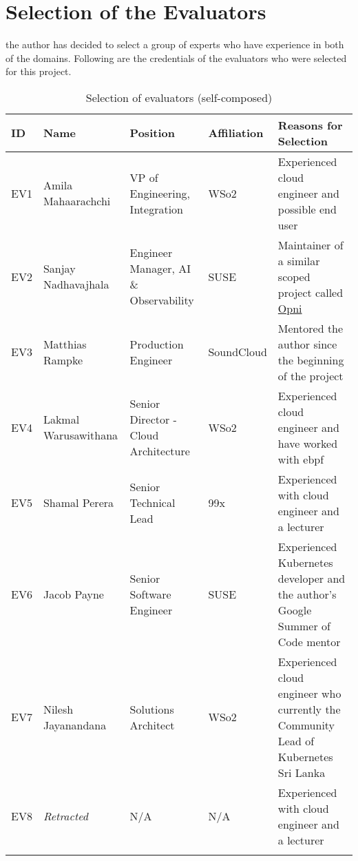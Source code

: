 \section{Selection of the Evaluators}

the author has decided to select a group of experts who have experience in both of the domains. Following are the credentials of the evaluators who were selected for this project. 



\begin{longtable}{|p{8mm}|p{28mm}|p{35mm}|p{21mm}|p{50mm}|}
  \hline
  \textbf{ID} & \textbf{Name} & \textbf{Position} & \textbf{Affiliation} & \textbf{Reasons for Selection} \\ \hline
  EV1 & Amila Mahaarachchi & VP of Engineering, Integration & WSo2 & Experienced cloud engineer  and possible end user \\ \hline
  EV2 & Sanjay Nadhavajhala & Engineer Manager, AI \& Observability & SUSE & Maintainer of a similar scoped project called \href{https://opni.io/}{Opni} \\ \hline
  EV3 & Matthias Rampke & Production Engineer & SoundCloud & Mentored the author since the beginning of the project \\ \hline
  EV4 & Lakmal Warusawithana & Senior Director - Cloud Architecture & WSo2 & Experienced cloud engineer and have worked with \ac{ebpf} \\ \hline
  EV5 & Shamal Perera & Senior Technical Lead & 99x & Experienced with cloud engineer and a lecturer \\ \hline
  EV6 & Jacob Payne & Senior Software Engineer & SUSE & Experienced Kubernetes developer and the author’s Google Summer of Code mentor \\ \hline
  EV7 & Nilesh Jayanandana & Solutions Architect & WSo2 & Experienced cloud engineer who currently the Community Lead of Kubernetes Sri Lanka \\ \hline
  EV8 & \textit{Retracted} & N/A & N/A & Experienced with cloud engineer and a lecturer \\ \hline

  \caption{Selection of evaluators (self-composed)}
\end{longtable}

